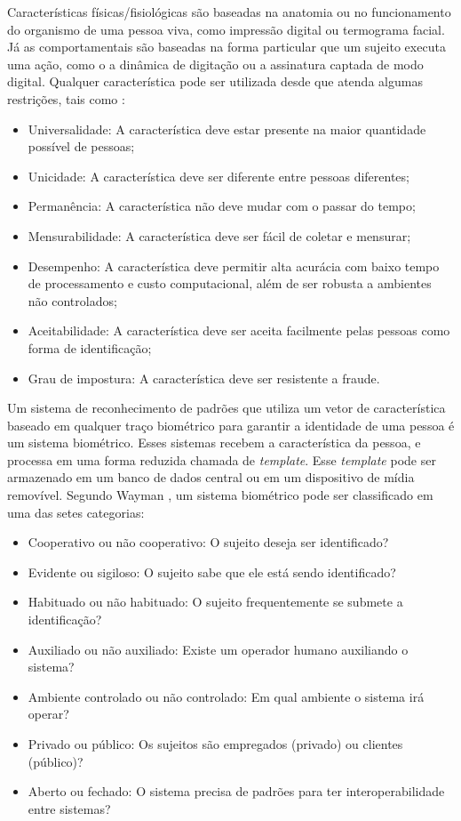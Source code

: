 Características físicas/fisiológicas são baseadas na anatomia ou no funcionamento do organismo de uma pessoa viva, como impressão digital ou termograma facial. Já as comportamentais são baseadas na forma particular que um sujeito executa uma ação, como o a dinâmica de digitação ou a assinatura captada de modo digital. Qualquer característica pode ser utilizada desde que atenda algumas restrições, tais como \cite{maltoni2009handbook}:

\begin{itemize}
\item Universalidade: A característica deve estar presente na maior quantidade possível de pessoas;
\item Unicidade: A característica deve ser diferente entre pessoas diferentes;
\item Permanência: A característica não deve mudar com o passar do tempo;
\item Mensurabilidade: A característica deve ser fácil de coletar e mensurar;
\item Desempenho: A característica deve permitir alta acurácia com baixo tempo de processamento e custo computacional, além de ser robusta a ambientes não controlados;
\item Aceitabilidade: A característica deve ser aceita facilmente pelas pessoas como forma de identificação;
\item Grau de impostura: A característica deve ser resistente a fraude.
\end{itemize}

Um sistema de reconhecimento de padrões que utiliza um vetor de característica baseado em qualquer traço biométrico para garantir a identidade de uma pessoa é um sistema biométrico. Esses sistemas recebem a característica da pessoa, e processa em uma forma reduzida chamada de \textit{template}. Esse \textit{template} pode ser armazenado em um banco de dados central ou em um dispositivo de mídia removível. Segundo Wayman \cite{wayman2002}, um sistema biométrico pode ser classificado em uma das setes categorias: 

\begin{itemize}
\item Cooperativo ou não cooperativo: O sujeito deseja ser identificado?
\item Evidente ou sigiloso: O sujeito sabe que ele está sendo identificado?
\item Habituado ou não habituado: O sujeito frequentemente se submete a identificação?
\item Auxiliado ou não auxiliado: Existe um operador humano auxiliando o sistema?
\item Ambiente controlado ou não controlado: Em qual ambiente o sistema irá operar?
\item Privado ou público: Os sujeitos são empregados (privado) ou clientes (público)?
\item Aberto ou fechado: O sistema precisa de padrões para ter interoperabilidade entre sistemas?
\end{itemize}




